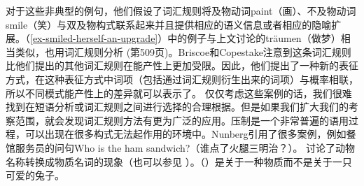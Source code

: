 \zl
对于这些非典型的例句，他们假设了词汇规则将及物动词paint（画）、不及物动词smile（笑）与双及物构式联系起来并且提供相应的语义信息或者相应的隐喻扩展。（\ref{ex-smiled-herself-an-upgrade}）中的例子与上文讨论的träumen（做梦）相当类似，也用词汇规则分析 (第509页)。Briscoe和Copestake注意到这条词汇规则比他们提出的其他词汇规则在能产性上更加受限。因此，他们提出了一种新的表征方式，在这种表征方式中词项（包括通过词汇规则衍生出来的词项）与概率相联，所以不同模式能产性上的差异就可以表示了。
    仅仅考虑这些案例的话，我们很难找到在短语分析或词汇规则之间进行选择的合理根据。但是如果我们扩大我们的考察范围，就会发现词汇规则方法有更为广泛的应用。压制是一个非常普遍的语用过程，可以出现在很多构式无法起作用的环境中\citep{Nunberg95a-u}。Nunberg引用了很多案例，例如餐馆服务员的问句Who is the ham sandwich?（谁点了火腿三明治？）\citep[]{Nunberg95a-u}。 \citet[]{CB92a}讨论了动物名称转换成物质名词的现象（也可以参见 \citet[--43]{CB95a-u}）。（）是关于一种物质而不是关于一只可爱的兔子。

